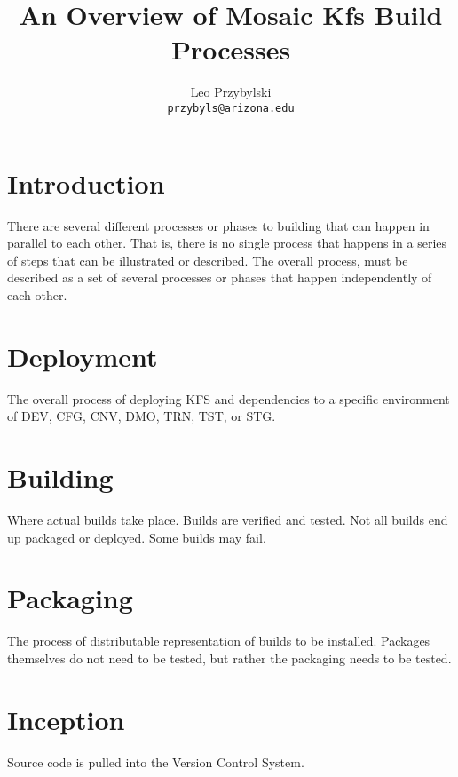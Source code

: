 \documentclass[12pt,notitlepage]{article}
\author{Leo Przybylski \\
\texttt{przybyls@arizona.edu}}
\title{An Overview of Mosaic Kfs Build Processes}
\begin{document}
\maketitle
\tableofcontents

\section{Introduction}
There are several different processes or phases to building that can happen
in parallel to each other. That is, there is no single process that happens in
a series of steps that can be illustrated or described. The overall process, must
be described as a set of several processes or phases that happen independently
of each other.

\section{Deployment}
The overall process of deploying KFS and dependencies to a specific environment of DEV, CFG, CNV, DMO, TRN, TST, or STG.

\section{Building}
Where actual builds take place. Builds are verified and tested. Not all builds
end up packaged or deployed. Some builds may fail.

\section{Packaging}
The process of distributable representation of builds to be installed. Packages themselves do not need
to be tested, but rather the packaging needs to be tested.

\section{Inception}
Source code is pulled into the Version Control System. 
\end{document}
